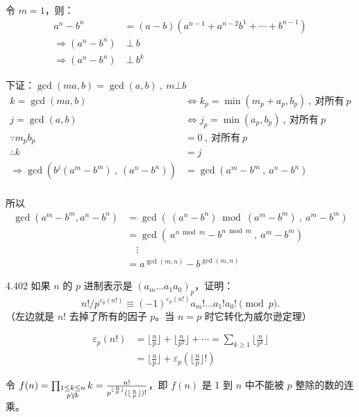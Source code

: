 令 \( m = 1 \)，则：
\begin{align*}
  a^n - b^n &= (a-b) (a^{n-1} + a^{n-2}b^1 + \cdots + b^{n-1}) \\
  \Rightarrow (a^n - b^n) & \ \bot \ b \\
  \Rightarrow (a^n - b^n) & \ \bot \ b^k
\end{align*}

下证：\( \gcd(ma,b) = \gcd(a,b) \ , \ m \bot b \)
\begin{align*}
  k = \gcd(ma,b) &\Leftrightarrow k_p = \min(m_p + a_p , b_p) \ , \ \text{对所有} \ p \\
  j = \gcd(a,b) &\Leftrightarrow j_p = \min(a_p , b_p) \ , \ \text{对所有} \ p \\
  \because m_p b_p &= 0 \ , \ \text{对所有} \ p \\
  \therefore k &= j \\
  \Rightarrow \gcd(b^j (a^m - b^m) \ , \ (a^n - b^n)) &= \gcd(a^m - b^m \ , \ a^n - b^n) \\
\end{align*}

所以
\begin{align*}
  \gcd(a^m - b^m , a^n - b^n) &= \gcd( \ (a^n - b^n) \bmod (a^m - b^m) \ , \ a^m - b^m) \\
  &= \gcd(\ a^{n \bmod m} - b^{n \bmod m} \ , \ a^m - b^m) \\
  & \quad \vdots \\
  &= a^{\gcd(m,n)} - b^{\gcd(m,n)}
\end{align*}

\begin{problem}{4.40}{2}
  如果 \( n \) 的 \( p \) 进制表示是 \( (a_m \dots a_1 a_0)_p \)，证明：
  \[
    n!/p^{\varepsilon_p(n!)} \equiv (-1)^{\varepsilon_p(n!)}a_m! \dots a_1! a_0! \pmod{p}.
  \]
  （左边就是 \( n! \) 去掉了所有的因子 \( p \)。当 \( n = p \) 时它转化为威尔逊定理）
\end{problem}

\begin{align*}
  \varepsilon_p(n!) &= \lfloor \frac{n}{p} \rfloor + \lfloor \frac{n}{p^2} \rfloor + \cdots = \sum_{k \ge 1} \lfloor \frac{n}{p^k} \rfloor \\
  &= \lfloor \frac{n}{p} \rfloor + \varepsilon_p(\lfloor \frac{n}{p} \rfloor !)
\end{align*}

令 \( f(n) = \prod_{\substack{1 \le k \le n \\ p \not \setminus k}} k = \frac{n!}{p^{\lfloor \frac{n}{p} \rfloor} (\lfloor \frac{n}{p} \rfloor)!} \)，即 \( f(n) \) 是 1 到 \( n \) 中不能被 \( p \) 整除的数的连乘。

